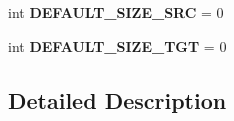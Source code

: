 \begin{DoxyCompactItemize}
\item 
int {\bfseries D\+E\+F\+A\+U\+L\+T\+\_\+\+S\+I\+Z\+E\+\_\+\+S\+RC} = 0\hypertarget{namespacealign__vocabs_ac1aed304e5e275ed3130d7909170db3a}{}\label{namespacealign__vocabs_ac1aed304e5e275ed3130d7909170db3a}

\item 
int {\bfseries D\+E\+F\+A\+U\+L\+T\+\_\+\+S\+I\+Z\+E\+\_\+\+T\+GT} = 0\hypertarget{namespacealign__vocabs_a8c4561b234a9afd21d1e30e73c980ab9}{}\label{namespacealign__vocabs_a8c4561b234a9afd21d1e30e73c980ab9}

\end{DoxyCompactItemize}


\subsection{Detailed Description}
\begin{DoxyVerb}\end{DoxyVerb}
 